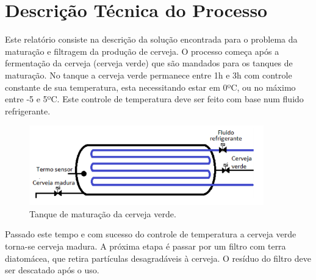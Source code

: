 \documentclass[12pt]{article}
\begin{document}
	
	
	\tableofcontents
	
	\clearpage
	
	\section{Descrição Técnica do Processo}
	
	\begin{par}
		Este relatório consiste na descrição da solução encontrada para o problema da maturação e filtragem da produção de cerveja. O processo começa após a fermentação da cerveja (cerveja verde) que são mandados para os tanques de maturação. No tanque a cerveja verde permanece entre 1h e 3h com controle constante de sua temperatura, esta necessitando estar em 0ºC, ou no máximo entre -5 e 5ºC. Este controle de temperatura deve ser feito com base num fluido refrigerante.
	\end{par}
	
	\begin{figure}[H]
		\centering
		\includegraphics [width=4in]{tanque.png}
		\caption {Tanque de maturação da cerveja verde.}
		\label{fig:corrente}
	\end{figure}
	
	\begin{par}
		Passado este tempo e com sucesso do controle de temperatura a cerveja verde torna-se cerveja madura. A próxima etapa é passar por um filtro com terra diatomácea, que retira partículas desagradáveis à cerveja. O resíduo do filtro deve ser descatado após o uso.
	\end{par}
	
\end{document}
